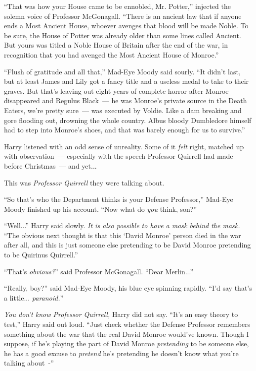 ``That was how your House came to be ennobled, Mr. Potter,'' injected the solemn voice of Professor McGonagall. ``There is an ancient law that if anyone ends a Most Ancient House, whoever avenges that blood will be made Noble. To be sure, the House of Potter was already older than some lines called Ancient. But yours was titled a Noble House of Britain after the end of the war, in recognition that you had avenged the Most Ancient House of Monroe.''

``Flush of gratitude and all that,'' Mad-Eye Moody said sourly. ``It didn't last, but at least James and Lily got a fancy title and a useless medal to take to their graves. But that's leaving out eight years of complete horror after Monroe disappeared and Regulus Black~--- he was Monroe's private source in the Death Eaters, we're pretty sure~--- was executed by Voldie. Like a dam breaking and gore flooding out, drowning the whole country. Albus bloody Dumbledore himself had to step into Monroe's shoes, and that was barely enough for us to survive.''

Harry listened with an odd sense of unreality. Some of it \emph{felt} right, matched up with observation~--- especially with the speech Professor Quirrell had made before Christmas~--- and yet...

This was \emph{Professor Quirrell} they were talking about.

``So that's who the Department thinks is your Defense Professor,'' Mad-Eye Moody finished up his account. ``Now what do \emph{you} think, son?''

``Well...'' Harry said slowly. \emph{It is also possible to have a mask behind the mask.} ``The obvious next thought is that this `David Monroe' person died in the war after all, and this is just someone else pretending to be David Monroe pretending to be Quirinus Quirrell.''

``That's \emph{obvious?}'' said Professor McGonagall. ``Dear Merlin...''

``Really, boy?'' said Mad-Eye Moody, his blue eye spinning rapidly. ``I'd say that's a little... \emph{paranoid.}''

\emph{You don't know Professor Quirrell,} Harry did not say. ``It's an easy theory to test,'' Harry said out loud. ``Just check whether the Defense Professor remembers something about the war that the real David Monroe would've known. Though I suppose, if he's playing the part of David Monroe \emph{pretending} to be someone else, he has a good excuse to \emph{pretend} he's pretending he doesn't know what you're talking about~-''

